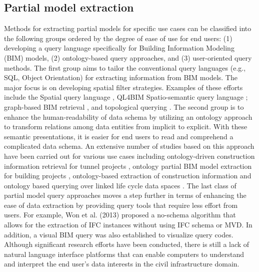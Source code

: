 \documentclass[Journal, InsideFigs, DoubleSpace]{ascelike} %
\begin{document}
\subsection{Partial model extraction}
Methods for extracting partial models for specific use cases can be classified into the following groups ordered by the degree of ease of use for end users: (1) developing a query language specifically for Building Information Modeling (BIM) models, (2) ontology-based query approaches, and (3) user-oriented query methods. The first group aims to tailor the conventional query languages (e.g., SQL, Object Orientation) for extracting information from BIM models. The major focus is on developing spatial filter strategies. Examples of these efforts include the Spatial query language \cite{borrmann09}, QL4BIM Spatio-semantic query language \cite{daum14}; graph-based BIM retrieval \cite{langenhan13}, and topological querying \cite{khalili13}. The second group is to enhance the human-readability of data schema by utilizing an ontology approach to transform relations among data entities from implicit to explicit. With these semantic presentations, it is easier for end users to read and comprehend a complicated data schema. An extensive number of studies based on this approach have been carried out for various use cases including ontology-driven construction information retrieval for tunnel projects \cite{min14}, ontology partial BIM model extraction for building projects \cite{zhang12}, ontology-based extraction of construction information \cite{nepal12} and ontology based querying over linked life cycle data spaces \cite{le16}. The last class of partial model query approaches moves a step further in terms of enhancing the ease of data extraction by providing query tools that require less effort from users. For example, Won et al. (2013) \cite{won13} proposed a no-schema algorithm that allows for the extraction of IFC instances without using IFC schema or MVD. In addition, a visual BIM query \cite{wulfing14} was also established to visualize query codes. Although significant research efforts have been conducted, there is still a lack of natural language interface platforms that can enable computers to understand and interpret the end user’s data interests in the civil infrastructure domain.
\end{document}
